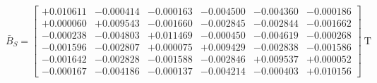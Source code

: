 \[
\bar{B}_S =
\begin{bmatrix}
 +0.010611 &  -0.000414 &  -0.000163 &  -0.004500 &  -0.004360 &  -0.000186 \\
 +0.000060 &  +0.009543 &  -0.001660 &  -0.002845 &  -0.002844 &  -0.001662 \\
 -0.000238 &  -0.004803 &  +0.011469 &  -0.000450 &  -0.004619 &  -0.000268 \\
 -0.001596 &  -0.002807 &  +0.000075 &  +0.009429 &  -0.002838 &  -0.001586 \\
 -0.001642 &  -0.002828 &  -0.001588 &  -0.002846 &  +0.009537 &  +0.000052 \\
 -0.000167 &  -0.004186 &  -0.000137 &  -0.004214 &  -0.000403 &  +0.010156
\end{bmatrix}\ \mathrm{T}
\]
